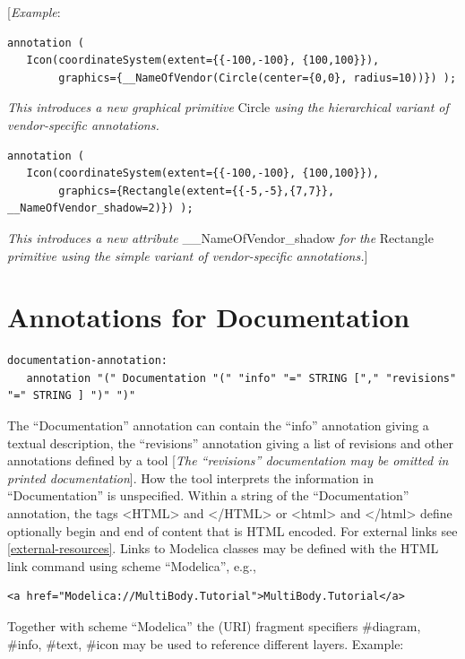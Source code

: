 \documentclass[10pt,a4paper]{report}
\def\doublelabel#1{\label{#1}}
\begin{document}
{[}\emph{Example}:
\begin{lstlisting}[language=modelica]
annotation (
   Icon(coordinateSystem(extent={{-100,-100}, {100,100}}),
        graphics={__NameOfVendor(Circle(center={0,0}, radius=10))}) ); 
\end{lstlisting}
\emph{This introduces a new graphical primitive} Circle \emph{using the
hierarchical variant of vendor-specific annotations.}
\begin{lstlisting}[language=modelica]
annotation (
   Icon(coordinateSystem(extent={{-100,-100}, {100,100}}),
        graphics={Rectangle(extent={{-5,-5},{7,7}}, __NameOfVendor_shadow=2)}) ); 
\end{lstlisting}
\emph{This introduces a new attribute} \_\_NameOfVendor\_shadow
\emph{for the} Rectangle \emph{primitive using the simple variant of
vendor-specific annotations.}{]}

\section{Annotations for Documentation}\doublelabel{annotations-for-documentation}

\begin{lstlisting}[language=grammar]
documentation-annotation:
   annotation "(" Documentation "(" "info" "=" STRING ["," "revisions" "=" STRING ] ")" ")"
\end{lstlisting}
The ``Documentation'' annotation can contain the ``info'' annotation
giving a textual description, the ``revisions'' annotation giving a list
of revisions and other annotations defined by a tool {[}\emph{The
``revisions'' documentation may be omitted in printed documentation}{]}.
How the tool interprets the information in ``Documentation'' is
unspecified. Within a string of the ``Documentation'' annotation, the
tags \textless{}HTML\textgreater{} and \textless{}/HTML\textgreater{} or
\textless{}html\textgreater{} and \textless{}/html\textgreater{} define
optionally begin and end of content that is HTML encoded. For external
links see \ref{external-resources}. Links to Modelica classes may be defined with
the HTML link command using scheme ``Modelica'', e.g.,

\begin{lstlisting}[language=modelica]
<a href="Modelica://MultiBody.Tutorial">MultiBody.Tutorial</a> 
\end{lstlisting}

Together with scheme ``Modelica'' the (URI) fragment specifiers
\#diagram, \#info, \#text, \#icon may be used to reference different
layers. Example:
\end{document}
